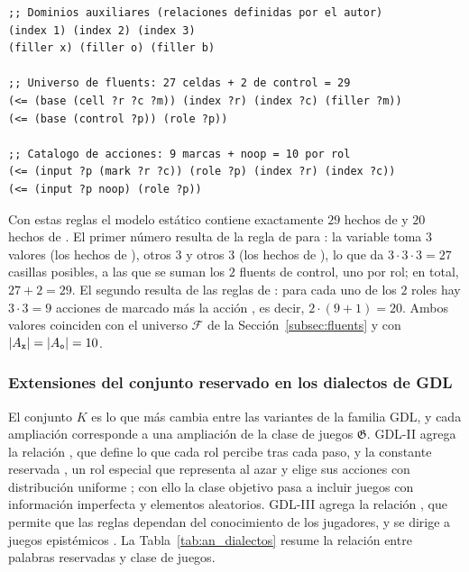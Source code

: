 \begin{lstlisting}[morekeywords={base,input},caption={Declaración del universo de fluents y del catálogo de acciones del Gato mediante \kw{base} e \kw{input}.},label={lst:an_base_input_gato}]
;; Dominios auxiliares (relaciones definidas por el autor)
(index 1) (index 2) (index 3)
(filler x) (filler o) (filler b)

;; Universo de fluents: 27 celdas + 2 de control = 29
(<= (base (cell ?r ?c ?m)) (index ?r) (index ?c) (filler ?m))
(<= (base (control ?p)) (role ?p))

;; Catalogo de acciones: 9 marcas + noop = 10 por rol
(<= (input ?p (mark ?r ?c)) (role ?p) (index ?r) (index ?c))
(<= (input ?p noop) (role ?p))
\end{lstlisting}

Con estas reglas el modelo estático contiene exactamente $29$ hechos de  y $20$ hechos de . El primer número resulta de la regla de  para : la variable  toma $3$ valores (los hechos de ),  otros $3$ y  otros $3$ (los hechos de ), lo que da $3 \cdot 3 \cdot 3 = 27$ casillas posibles, a las que se suman los $2$ fluents de control, uno por rol; en total, $27 + 2 = 29$. El segundo resulta de las reglas de : para cada uno de los $2$ roles hay $3 \cdot 3 = 9$ acciones de marcado más la acción , es decir, $2 \cdot (9 + 1) = 20$. Ambos valores coinciden con el universo $\mathcal F$ de la Sección~\ref{subsec:fluents} y con $|A_{\texttt{x}}| = |A_{\texttt{o}}| = 10$.

\subsubsection{Extensiones del conjunto reservado en los dialectos de GDL}

El conjunto $K$ es lo que más cambia entre las variantes de la familia GDL, y cada ampliación corresponde a una ampliación de la clase de juegos $\mathfrak G$. GDL-II agrega la relación , que define lo que cada rol percibe tras cada paso, y la constante reservada , un rol especial que representa al azar y elige sus acciones con distribución uniforme \cite{Thielscher2010GDLII, SchiffelThielscher2014JAIR}; con ello la clase objetivo pasa a incluir juegos con información imperfecta y elementos aleatorios. GDL-III agrega la relación , que permite que las reglas dependan del conocimiento de los jugadores, y se dirige a juegos epistémicos \cite{Thielscher2017GDLIII}. La Tabla~\ref{tab:an_dialectos} resume la relación entre palabras reservadas y clase de juegos.

